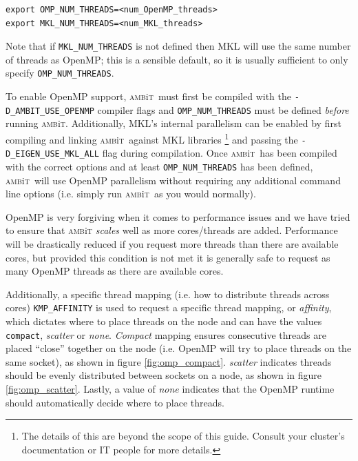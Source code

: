 \documentclass{report}
\newcommand{\ambit}{\textsc{amb}{\footnotesize i}\textsc{t}}
\begin{document}
\begin{verbatim}
export OMP_NUM_THREADS=<num_OpenMP_threads>
export MKL_NUM_THREADS=<num_MKL_threads>
\end{verbatim}

Note that if \texttt{MKL\_NUM\_THREADS} is not defined then MKL will use the same number of threads as 
OpenMP; this is a sensible default, so it is usually sufficient to only specify 
\texttt{OMP\_NUM\_THREADS}. 

To enable OpenMP support, \ambit\ must first be compiled with the \texttt{-D\_AMBIT\_USE\_OPENMP} compiler
flags and \texttt{OMP\_NUM\_THREADS} must be defined \emph{before} running \ambit. Additionally, MKL's
internal parallelism can be enabled by first compiling and linking \ambit\ against MKL libraries%
\footnote{The details of this are beyond the scope of this guide. Consult your cluster's documentation or
IT people for more details.} and passing the \texttt{-D\_EIGEN\_USE\_MKL\_ALL} flag during compilation.
Once \ambit\ has been compiled with the correct options and at least \texttt{OMP\_NUM\_THREADS} has been
defined, \ambit\ will use OpenMP parallelism without requiring any additional command line options (i.e.
simply run \ambit\ as you would normally).

OpenMP is very forgiving when it comes to performance issues and we have tried to ensure that \ambit
\textit{scales} well as more cores/threads are added. Performance will be drastically reduced if you
request more threads than there are available cores, but provided this condition is not met it is
generally safe to request as many OpenMP threads as there are available cores.

Additionally, a specific thread mapping (i.e. how to distribute threads across cores)
\texttt{KMP\_AFFINITY} is used to request a specific thread mapping, or
\textit{affinity}, which dictates where to place threads on the node and can have the values 
\texttt{compact}, \textit{scatter} or \textit{none}. \textit{Compact} mapping ensures consecutive 
threads are placed ``close'' together on the node (i.e. OpenMP will try to place threads on the same 
socket), as shown in figure \ref{fig:omp_compact}. 
\textit{scatter} indicates threads should be evenly distributed between sockets on a node, as shown in
figure \ref{fig:omp_scatter}.
Lastly, a value of \textit{none} indicates that the OpenMP runtime should automatically decide where to 
place threads.
\end{document}
